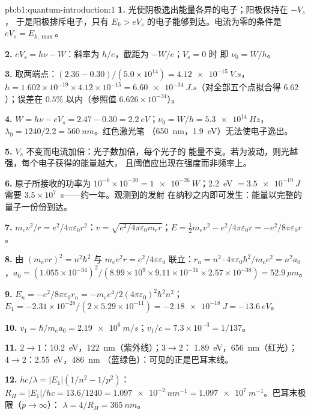 \begin{solution}{pb:b1:quantum-introduction:1}
\textbf{1.} 光使阴极逸出能量各异的电子；阳极保持在 $-V_s$，
于是阳极排斥电子，只有
$E_k > eV_s$ 的电子能够到达。电流为零的条件是 $eV_s = E_{k,\max}$。

\textbf{2.} $eV_s = h\nu - W$：斜率为 $h/e$，截距为 $-W/e$；$V_s = 0$ 时
即 $\nu_0 = W/h$。

\textbf{3.} 取两端点：$(2.36 - 0.30)/(5.0 \times 10^{14}) = \qty{4.12e-15}{V.s}$，
$h = 1.602 \times 10^{-19} \times 4.12 \times 10^{-15} = \qty{6.60e-34}{J.s}$（对全部五个点拟合得
$6.62$）；误差在 $0.5\%$ 以内（参照值 $6.626 \times 10^{-34}$）。

\textbf{4.} $W = h\nu - eV_s = 2.47 - 0.30 = \qty{2.2}{eV}$；$\nu_0 = W/h =
\qty{5.3e14}{Hz}$，$\lambda_0 = 1240/2.2 = \qty{560}{nm}$。红色激光笔
（\qty{650}{nm}，\qty{1.9}{eV}）无法使电子逸出。

\textbf{5.} $V_s$ 不变而电流加倍：光子数加倍，每个光子的
能量不变。若为波动，则光越强，每个电子获得的能量越大，
且阈值应出现在强度而非频率上。

\textbf{6.} 原子所接收的功率为 $10^{-6} \times 10^{-20} = \qty{1e-26}{W}$；\qty{2.2}{eV} $=
\qty{3.5e-19}{J}$ 需要 $3.5 \times 10^7$~s——约一年。观测到的发射
在纳秒之内即可发生：能量以完整的量子一份份到达。

\textbf{7.} $m_ev^2/r = e^2/4\pi\varepsilon_0r^2$：$v = \sqrt{e^2/4\pi\varepsilon_0m_er}$；$E =
\tfrac12m_ev^2 - e^2/4\pi\varepsilon_0r = -e^2/8\pi\varepsilon_0r$。

\textbf{8.} 由 $(m_evr)^2 = n^2\hbar^2$ 与 $m_ev^2r = e^2/4\pi\varepsilon_0$ 联立：$r_n = n^2 \cdot
4\pi\varepsilon_0\hbar^2/m_ee^2 = n^2a_0$，$a_0 = (1.055 \times 10^{-34})^2/(8.99 \times 10^9
\times 9.11 \times 10^{-31} \times 2.57 \times 10^{-38}) = \qty{52.9}{pm}$。

\textbf{9.} $E_n = -e^2/8\pi\varepsilon_0r_n = -m_ee^4/2(4\pi\varepsilon_0)^2\hbar^2n^2$；$E_1 =
-2.31 \times 10^{-28}/(2 \times 5.29 \times 10^{-11}) = \qty{-2.18e-18}{J} = \qty{-13.6}{eV}$。

\textbf{10.} $v_1 = \hbar/m_ea_0 = \qty{2.19e6}{m/s}$；$v_1/c = 7.3 \times 10^{-3} =
1/137$。

\textbf{11.} $2 \to 1$：\qty{10.2}{eV}，\qty{122}{nm}（紫外线）；$3 \to 2$：
\qty{1.89}{eV}，\qty{656}{nm}（红光）；$4 \to 2$：\qty{2.55}{eV}，\qty{486}{nm}
（蓝绿色）：可见的正是巴耳末线。

\textbf{12.} $hc/\lambda = |E_1|(1/n^2 - 1/p^2)$：$R_H = |E_1|/hc = 13.6/1240 =
\qty{1.097e-2}{nm^{-1}} = \qty{1.097e7}{m^{-1}}$。巴耳末极限（$p \to \infty$）：
$\lambda = 4/R_H = \qty{365}{nm}$。


\end{solution}
